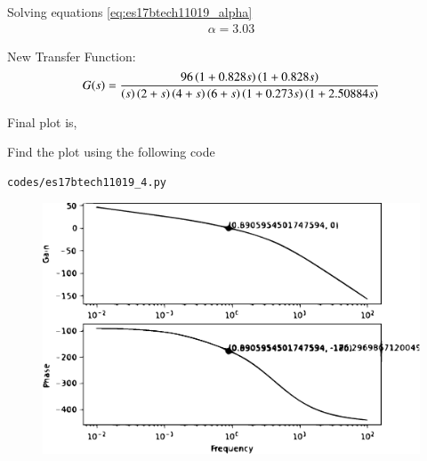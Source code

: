 \begin{enumerate}[label=\thesection.\arabic*.,ref=\thesection.\theenumi]
Solving equations \ref{eq:es17btech11019_alpha}
\begin{align}

\alpha=3.03
\label{eq:es17btech11019_final}
\end{align}

New Transfer Function:
\begin{align}
G(s)=\frac{96\left(1+ 0.828s\right)\left(1+0.828s\right)}{\left(s\right)\left(2+s\right)\left(4+s\right)\left(6+s\right)\left(1+0.273s\right)\left(1+2.50884s\right)}
\end{align}

Final plot is,

Find the plot using the following code
\begin{lstlisting}
codes/es17btech11019_4.py
\end{lstlisting}

\begin{figure}[!ht]
  \centering
  \includegraphics[width=\columnwidth]{./figs/es17btech11019_5}
  \caption{}
  \label{fig:es17btech11019_4}
\end{figure}


\end{enumerate}
